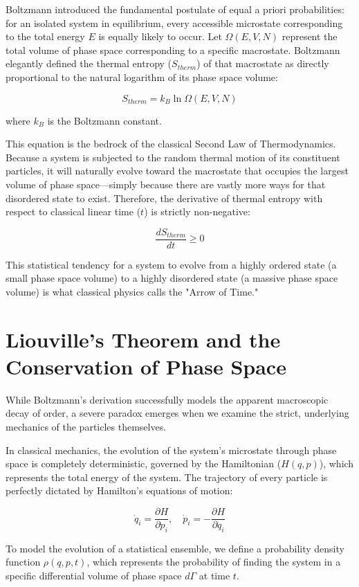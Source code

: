 \documentclass[12pt,openany]{book}
\theoremstyle{plain}
\theoremstyle{definition}
\theoremstyle{remark}
\begin{document}
Boltzmann introduced the fundamental postulate of equal a priori probabilities: for an isolated system in equilibrium, every accessible microstate corresponding to the total energy $E$ is equally likely to occur. Let $\Omega(E, V, N)$ represent the total volume of phase space corresponding to a specific macrostate. Boltzmann elegantly defined the thermal entropy ($S_{therm}$) of that macrostate as directly proportional to the natural logarithm of its phase space volume:

$$S_{therm}=k_B\ln\Omega(E,V,N)$$

where $k_B$ is the Boltzmann constant.

This equation is the bedrock of the classical Second Law of Thermodynamics. Because a system is subjected to the random thermal motion of its constituent particles, it will naturally evolve toward the macrostate that occupies the largest volume of phase space—simply because there are vastly more ways for that disordered state to exist. Therefore, the derivative of thermal entropy with respect to classical linear time ($t$) is strictly non-negative:

$$\frac{dS_{therm}}{dt}\ge0$$

This statistical tendency for a system to evolve from a highly ordered state (a small phase space volume) to a highly disordered state (a massive phase space volume) is what classical physics calls the "Arrow of Time."

\section{Liouville's Theorem and the Conservation of Phase Space}
While Boltzmann's derivation successfully models the apparent macroscopic decay of order, a severe paradox emerges when we examine the strict, underlying mechanics of the particles themselves.

In classical mechanics, the evolution of the system's microstate through phase space is completely deterministic, governed by the Hamiltonian ($H(q, p)$), which represents the total energy of the system. The trajectory of every particle is perfectly dictated by Hamilton's equations of motion:

$$\dot{q}_i=\frac{\partial H}{\partial p_i}, \quad \dot{p}_i=-\frac{\partial H}{\partial q_i}$$

To model the evolution of a statistical ensemble, we define a probability density function $\rho(q, p, t)$, which represents the probability of finding the system in a specific differential volume of phase space $d\Gamma$ at time $t$.
\end{document}
